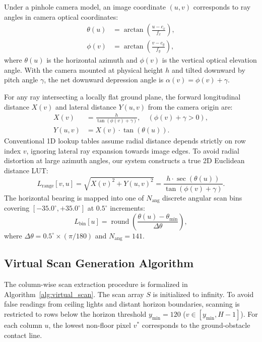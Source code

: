\documentclass[preprint,12pt]{elsarticle}
\begin{document}
Under a pinhole camera model, an image coordinate $(u, v)$ corresponds to ray angles in camera optical coordinates:
\begin{align}
  \theta(u) &= \arctan\left(\frac{u - c_x}{f_x}\right), \\
  \phi(v)   &= \arctan\left(\frac{v - c_y}{f_y}\right),
\end{align}
where $\theta(u)$ is the horizontal azimuth and $\phi(v)$ is the vertical optical elevation angle. With the camera mounted at physical height $h$ and tilted downward by pitch angle $\gamma$, the net downward depression angle is $\alpha(v) = \phi(v) + \gamma$.

For any ray intersecting a locally flat ground plane, the forward longitudinal distance $X(v)$ and lateral distance $Y(u, v)$ from the camera origin are:
\begin{align}
  X(v) &= \frac{h}{\tan(\phi(v) + \gamma)}, \quad (\phi(v) + \gamma > 0), \\
  Y(u, v) &= X(v) \cdot \tan(\theta(u)).
\end{align}
Conventional 1D lookup tables assume radial distance depends strictly on row index $v$, ignoring lateral ray expansion towards image edges. To avoid radial distortion at large azimuth angles, our system constructs a true 2D Euclidean distance LUT:
\begin{equation}
  L_{\mathrm{range}}[v, u] = \sqrt{X(v)^2 + Y(u, v)^2} = \frac{h \cdot \sec(\theta(u))}{\tan(\phi(v) + \gamma)}.
\end{equation}
The horizontal bearing is mapped into one of $N_{\mathrm{ang}}$ discrete angular scan bins covering $[-35.0^\circ, +35.0^\circ]$ at $0.5^\circ$ increments:
\begin{equation}
  L_{\mathrm{bin}}[u] = \operatorname{round}\left(\frac{\theta(u) - \theta_{\min}}{\Delta \theta}\right),
\end{equation}
where $\Delta \theta = 0.5^\circ \times (\pi / 180)$ and $N_{\mathrm{ang}} = 141$.

\subsection{Virtual Scan Generation Algorithm}
The column-wise scan extraction procedure is formalized in Algorithm~\ref{alg:virtual_scan}. The scan array $S$ is initialized to infinity. To avoid false readings from ceiling lights and distant horizon boundaries, scanning is restricted to rows below the horizon threshold $y_{\min} = 120$ ($v \in [y_{\min}, H-1]$). For each column $u$, the lowest non-floor pixel $v^*$ corresponds to the ground-obstacle contact line.
\end{document}
